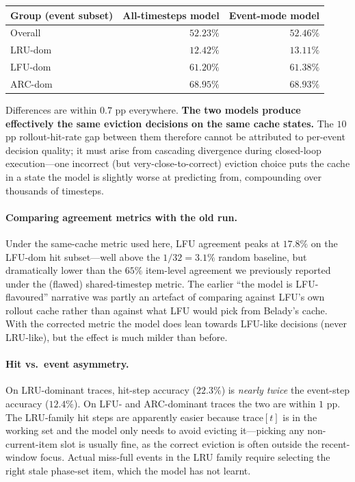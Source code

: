 \documentclass{article}
\begin{document}
\begin{center}
\begin{tabular}{lrr}
\toprule
Group (event subset) & All-timesteps model & Event-mode model \\
\midrule
Overall & $52.23\%$ & $52.46\%$ \\
LRU-dom & $12.42\%$ & $13.11\%$ \\
LFU-dom & $61.20\%$ & $61.38\%$ \\
ARC-dom & $68.95\%$ & $68.93\%$ \\
\bottomrule
\end{tabular}
\end{center}

Differences are within $0.7$ pp everywhere. \textbf{The two models produce
effectively the same eviction decisions on the same cache states.} The
$10$ pp rollout-hit-rate gap between them therefore cannot be attributed to
per-event decision quality; it must arise from cascading divergence during
closed-loop execution---one incorrect (but very-close-to-correct) eviction
choice puts the cache in a state the model is slightly worse at predicting
from, compounding over thousands of timesteps.

\paragraph{Comparing agreement metrics with the old run.} Under the
same-cache metric used here, LFU agreement peaks at $17.8\%$ on the LFU-dom
hit subset---well above the $1/32=3.1\%$ random baseline, but dramatically
lower than the $65\%$ item-level agreement we previously reported under the
(flawed) shared-timestep metric. The earlier ``the model is
LFU-flavoured'' narrative was partly an artefact of comparing against
LFU's own rollout cache rather than against what LFU would pick from
Belady's cache. With the corrected metric the model does lean towards
LFU-like decisions (never LRU-like), but the effect is much milder than
before.

\paragraph{Hit vs.\ event asymmetry.} On LRU-dominant traces, hit-step
accuracy ($22.3\%$) is \emph{nearly twice} the event-step accuracy
($12.4\%$). On LFU- and ARC-dominant traces the two are within $1$ pp.
The LRU-family hit steps are apparently easier because trace$[t]$ is in
the working set and the model only needs to avoid evicting it---picking any
non-current-item slot is usually fine, as the correct eviction is often
outside the recent-window focus. Actual miss-full events in the LRU family
require selecting the right stale phase-set item, which the model has not
learnt.
\end{document}
